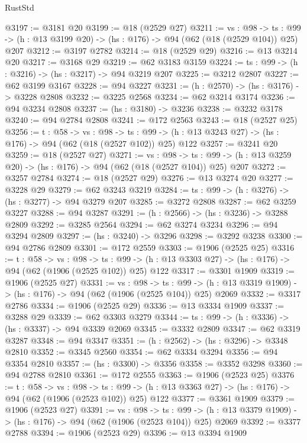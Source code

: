 \begin{lexlean}{RustStd}
\begin{coremodule}
@3197 := @3181 @20
@3199 := @18 (@2529 @27)
@3211 := {vs : @98} ->
  {ts : @99} -> (h : @13 @3199 @20) -> (hs : @176) -> @94 (@62 (@18 (@2529 @104)) @25) @207
@3212 := @3197 @2782
@3214 := @18 (@2529 @29)
@3216 := @13 @3214 @20
@3217 := @3168 @29
@3219 := @62 @3183 @3159
@3224 := {ts : @99} -> (h : @3216) -> (hs : @3217) -> @94 @3219 @207
@3225 := @3212 @2807
@3227 := @62 @3199 @3167
@3228 := @94 @3227
@3231 := (h : @2570) -> (hs : @3176) -> @3228 @2808
@3232 := @3225 @2568
@3234 := @62 @3214 @3174
@3236 := @94 @3234 @2808
@3237 := (hs : @3180) -> @3236
@3238 := @3232 @3178
@3240 := @94 @2784 @2808
@3241 := @172 @2563
@3243 := @18 (@2527 @25)
@3256 := {t : @58} ->
  {vs : @98} ->
  {ts : @99} -> (h : @13 @3243 @27) -> (hs : @176) -> @94 (@62 (@18 (@2527 @102)) @25) @122
@3257 := @3241 @20
@3259 := @18 (@2527 @27)
@3271 := {vs : @98} ->
  {ts : @99} -> (h : @13 @3259 @20) -> (hs : @176) -> @94 (@62 (@18 (@2527 @104)) @25) @207
@3272 := @3257 @2784
@3274 := @18 (@2527 @29)
@3276 := @13 @3274 @20
@3277 := @3228 @29
@3279 := @62 @3243 @3219
@3284 := {ts : @99} -> (h : @3276) -> (hs : @3277) -> @94 @3279 @207
@3285 := @3272 @2808
@3287 := @62 @3259 @3227
@3288 := @94 @3287
@3291 := (h : @2566) -> (hs : @3236) -> @3288 @2809
@3292 := @3285 @2564
@3294 := @62 @3274 @3234
@3296 := @94 @3294 @2809
@3297 := (hs : @3240) -> @3296
@3298 := @3292 @3238
@3300 := @94 @2786 @2809
@3301 := @172 @2559
@3303 := @1906 (@2525 @25)
@3316 := {t : @58} ->
  {vs : @98} ->
  {ts : @99} -> (h : @13 @3303 @27) -> (hs : @176) -> @94 (@62 (@1906 (@2525 @102)) @25) @122
@3317 := @3301 @1909
@3319 := @1906 (@2525 @27)
@3331 := {vs : @98} ->
  {ts : @99} -> (h : @13 @3319 @1909) -> (hs : @176) -> @94 (@62 (@1906 (@2525 @104)) @25) @2069
@3332 := @3317 @2786
@3334 := @1906 (@2525 @29)
@3336 := @13 @3334 @1909
@3337 := @3288 @29
@3339 := @62 @3303 @3279
@3344 := {ts : @99} -> (h : @3336) -> (hs : @3337) -> @94 @3339 @2069
@3345 := @3332 @2809
@3347 := @62 @3319 @3287
@3348 := @94 @3347
@3351 := (h : @2562) -> (hs : @3296) -> @3348 @2810
@3352 := @3345 @2560
@3354 := @62 @3334 @3294
@3356 := @94 @3354 @2810
@3357 := (hs : @3300) -> @3356
@3358 := @3352 @3298
@3360 := @94 @2788 @2810
@3361 := @172 @2555
@3363 := @1906 (@2523 @25)
@3376 := {t : @58} ->
  {vs : @98} ->
  {ts : @99} -> (h : @13 @3363 @27) -> (hs : @176) -> @94 (@62 (@1906 (@2523 @102)) @25) @122
@3377 := @3361 @1909
@3379 := @1906 (@2523 @27)
@3391 := {vs : @98} ->
  {ts : @99} -> (h : @13 @3379 @1909) -> (hs : @176) -> @94 (@62 (@1906 (@2523 @104)) @25) @2069
@3392 := @3377 @2788
@3394 := @1906 (@2523 @29)
@3396 := @13 @3394 @1909

\end{coremodule}
\end{lexlean}
